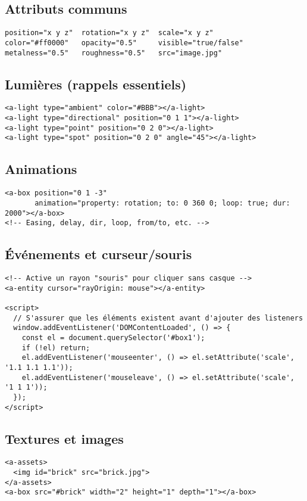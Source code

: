\documentclass[12pt]{article}
\begin{document}
\subsection{Attributs communs}
\begin{verbatim}
position="x y z"  rotation="x y z"  scale="x y z"
color="#ff0000"   opacity="0.5"     visible="true/false"
metalness="0.5"   roughness="0.5"   src="image.jpg"
\end{verbatim}

\subsection{Lumières (rappels essentiels)}
\begin{verbatim}
<a-light type="ambient" color="#BBB"></a-light>
<a-light type="directional" position="0 1 1"></a-light>
<a-light type="point" position="0 2 0"></a-light>
<a-light type="spot" position="0 2 0" angle="45"></a-light>
\end{verbatim}

\subsection{Animations}
\begin{verbatim}
<a-box position="0 1 -3"
       animation="property: rotation; to: 0 360 0; loop: true; dur: 2000"></a-box>
<!-- Easing, delay, dir, loop, from/to, etc. -->
\end{verbatim}

\subsection{Événements et curseur/souris}
\begin{verbatim}
<!-- Active un rayon "souris" pour cliquer sans casque -->
<a-entity cursor="rayOrigin: mouse"></a-entity>

<script>
  // S'assurer que les éléments existent avant d'ajouter des listeners
  window.addEventListener('DOMContentLoaded', () => {
    const el = document.querySelector('#box1');
    if (!el) return;
    el.addEventListener('mouseenter', () => el.setAttribute('scale', '1.1 1.1 1.1'));
    el.addEventListener('mouseleave', () => el.setAttribute('scale', '1 1 1'));
  });
</script>
\end{verbatim}

\subsection{Textures et images}
\begin{verbatim}
<a-assets>
  <img id="brick" src="brick.jpg">
</a-assets>
<a-box src="#brick" width="2" height="1" depth="1"></a-box>
\end{verbatim}
\end{document}
